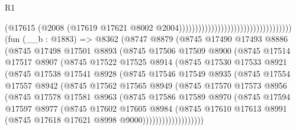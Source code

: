 \begin{lexlean}{R1}
\begin{coremodule}
                                                                    (@17615
                                                                      (@2008
                                                                        (@17619
                                                                          @17621
                                                                          @8002
                                                                          @2004)))))))))))))))))))))))))))))))))))
    (fun (__b : @1883) =>
    @8362
      (@8747
        @8879
        (@8745
          @17490
          @17493
          @8886
          (@8745
            @17498
            @17501
            @8893
            (@8745
              @17506
              @17509
              @8900
              (@8745
                @17514
                @17517
                @8907
                (@8745
                  @17522
                  @17525
                  @8914
                  (@8745
                    @17530
                    @17533
                    @8921
                    (@8745
                      @17538
                      @17541
                      @8928
                      (@8745
                        @17546
                        @17549
                        @8935
                        (@8745
                          @17554
                          @17557
                          @8942
                          (@8745
                            @17562
                            @17565
                            @8949
                            (@8745
                              @17570
                              @17573
                              @8956
                              (@8745
                                @17578
                                @17581
                                @8963
                                (@8745
                                  @17586
                                  @17589
                                  @8970
                                  (@8745
                                    @17594
                                    @17597
                                    @8977
                                    (@8745
                                      @17602
                                      @17605
                                      @8984
                                      (@8745
                                        @17610
                                        @17613
                                        @8991
                                        (@8745 @17618 @17621 @8998 @9000)))))))))))))))))))

\end{coremodule}
\end{lexlean}
